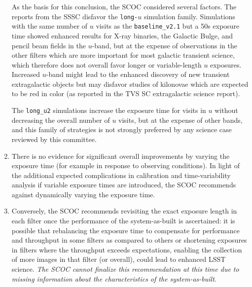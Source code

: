 \begin{enumerate}
As the basis for this conclusion, the SCOC considered several factors.  The reports from the SSSC disfavor the \texttt{long-$u$} simulation family. Simulations with the same number of $u$ visits as the \texttt{baseline\_v2.1} but a 50s exposure time showed enhanced results for X-ray binaries, the Galactic Bulge, and pencil beam fields in the $u$-band, but at the expense of observations in the other filters which are more important for most galactic transient science, which therefore does not overall favor longer or variable-length $u$ exposures. Increased $u$-band might lead to the enhanced discovery of new transient  extragalactic objects but may disfavor studies of kilonovae which are expected to be red in color (as reported in the TVS SC extragalactic science report).

The \texttt{long\_u2} simulations increase the exposure time for visits in $u$ without decreasing the overall number of $u$ visits, but at the expense of other bands, and this family of strategies is not strongly preferred by any science case reviewed by this committee.

\item There is no evidence for significant overall improvements by varying the exposure time (for example in response to observing conditions). In light of the additional expected complications in calibration and time-variability analysis if variable exposure times are introduced, the SCOC recommends against dynamically varying the exposure time. 

\item Conversely, the SCOC recommends revisiting the exact exposure length in each filter once the performance of the system-as-built is ascertained: it is possible that rebalancing the exposure time to compensate for performance and throughput in some filters as compared to others or shortening exposures in filters where the throughput exceeds expectations, enabling the collection of more images in that filter (or overall), could lead to enhanced LSST science. \emph{The SCOC cannot finalize this recommendation at this time due to missing information about the characteristics of the system-as-built}.




\end{enumerate}
